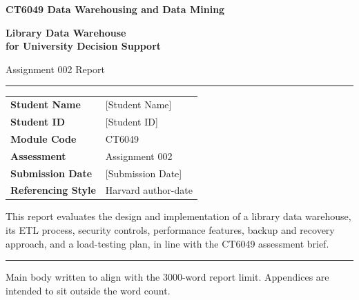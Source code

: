 \documentclass[12pt,a4paper]{article}
\newcommand{\studentname}{[Student Name]}
\newcommand{\studentid}{[Student ID]}
\newcommand{\submissiondate}{[Submission Date]}
\begin{document}
\hypersetup{pageanchor=false}
\begin{titlepage}
  \thispagestyle{empty}
  \centering

  {\Large\color{accent}\textbf{CT6049 Data Warehousing and Data Mining}\par}
  \vspace{1.2cm}

  {\Huge\bfseries\color{ink}Library Data Warehouse\\[0.2em]for University Decision Support\par}
  \vspace{0.8cm}

  {\Large Assignment 002 Report\par}
  \vspace{1.5cm}

  \rule{\textwidth}{0.8pt}\par
  \vspace{0.8cm}

  \begin{tabular}{L{0.33\textwidth}L{0.55\textwidth}}
    \textbf{Student Name} & \studentname \\
    \textbf{Student ID} & \studentid \\
    \textbf{Module Code} & CT6049 \\
    \textbf{Assessment} & Assignment 002 \\
    \textbf{Submission Date} & \submissiondate \\
    \textbf{Referencing Style} & Harvard author-date \\
  \end{tabular}

  \vfill

  \begin{minipage}{0.9\textwidth}
    \centering
    This report evaluates the design and implementation of a library data warehouse,
    its ETL process, security controls, performance features, backup and recovery approach,
    and a load-testing plan, in line with the CT6049 assessment brief.
  \end{minipage}

  \vfill
  \rule{\textwidth}{0.8pt}\par
  \vspace{0.3cm}
  {\small Main body written to align with the 3000-word report limit. Appendices are intended to sit outside the word count.}
\end{titlepage}
\clearpage
\hypersetup{pageanchor=true}

\end{document}
